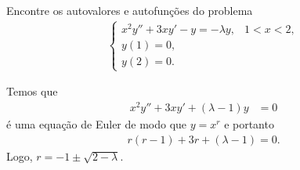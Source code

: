 \documentclass[a4paper,12pt, leqno, answers]{exam}
\begin{document}
\begin{questions}
\begin{parts}
\begin{solution}


        \end{solution}
    \end{parts}

    \question[E de 2006] Encontre os autovalores e autofun\c{c}\~{o}es do problema
    \begin{align*}
        \begin{cases}
            x^2 y'' + 3 x y' - y = - \lambda y, & 1 < x < 2, \\
            y(1) = 0, \\
            y(2) = 0.
        \end{cases}
    \end{align*}
    \begin{solution}
        Temos que
        \begin{align*}
            x^2 y'' + 3 x y' + (\lambda - 1) y &= 0
        \end{align*}
        \'{e} uma equa\c{c}\~{a}o de Euler de modo que $y = x^r$ e portanto
        \begin{align*}
            r (r - 1) + 3 r + (\lambda - 1) = 0.
        \end{align*}
        Logo, $r = -1 \pm \sqrt{2 - \lambda}$.


\end{solution}
\end{questions}
\end{document}
